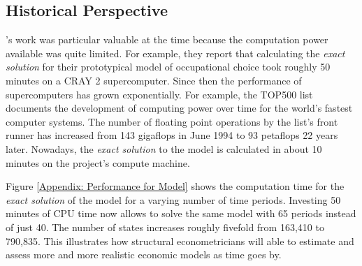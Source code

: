 \subsection{Historical Perspective}\label{Appendix: Historical Perspective}
\citet{Keane.1994}'s work was particular valuable at the time because the computation power available was quite limited. For example, they report that calculating the \textit{exact solution} for their prototypical model of occupational choice took roughly 50 minutes on a CRAY 2 supercomputer. Since then the performance of supercomputers has grown exponentially. For example, the TOP500 \citep{TOP500.2017} list documents the development of computing power over time for the world's fastest computer systems. The number of floating point operations by the list's front runner has increased from 143 gigaflops in June 1994 to 93 petaflops 22 years later. Nowadays, the \textit{exact solution} to the model is calculated in about 10 minutes on the project's compute machine.
%

%
Figure \ref{Appendix: Performance for Model} shows the computation time for the \textit{exact solution} of the model for a varying number of time periods. Investing 50 minutes of CPU time now allows to solve the same model with 65 periods instead of just 40. The number of states increases roughly fivefold from 163,410 to 790,835. This illustrates how structural econometricians will able to estimate and assess more and more realistic economic models as time goes by.
